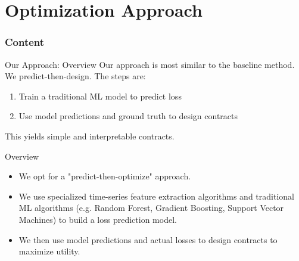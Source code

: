 \documentclass{beamer}
\begin{document}
\section{Optimization Approach}
\begin{frame}
    \frametitle{Content}
    \tableofcontents[currentsection]
  \end{frame}

  \begin{frame}{Our Approach: Overview}
    Our approach is most similar to the baseline method. We predict-then-design. The steps are: 
    \vspace{5mm}
    
    \begin{enumerate}
        \item Train a traditional ML model to predict loss
        \item Use model predictions and ground truth to design contracts
    \end{enumerate}
    
    \vspace{5mm}
    This yields simple and interpretable contracts. 
  \end{frame}

  \begin{frame}{Overview}
    \begin{itemize}
        \setlength\itemsep{2em}
        \item We opt for a "predict-then-optimize" approach.
        \item We use specialized time-series feature extraction algorithms and traditional ML algorithms (e.g. Random Forest, Gradient Boosting, Support Vector Machines) to build a loss prediction model.
        \item We then use model predictions and actual losses to design contracts to maximize utility. 
    \end{itemize}
\end{frame}

\end{document}
